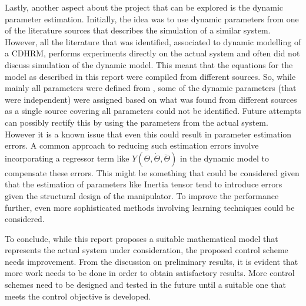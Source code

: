 \documentclass[a4paper,12pt]{report}
\begin{document}
Lastly, another aspect about the project that can be explored is the dynamic parameter estimation. Initially, the idea was to use dynamic parameters from one of the literature sources that describes the simulation of a similar system. However, all the literature that was identified, associated to dynamic modelling of a CDHRM, performs experiments directly on the actual system and often did not discuss simulation of the dynamic model. This meant that the equations for the model as described in this report were compiled from different sources. So, while mainly all parameters were defined from \cite{RN30}, some of the dynamic parameters (that were independent) were assigned based on what was found from different sources as a single source covering all parameters could not be identified. Future attempts can possibly rectify this by using the parameters from the actual system. However it is a known issue that even this could result in parameter estimation errors. A common approach to reducing such estimation errors involve incorporating a regressor term like $ Y(\Theta,\dot{\Theta},\ddot{\Theta}) $ in the dynamic model to compensate these errors. This might be something that could be considered given that the estimation of parameters like Inertia tensor tend to introduce errors given the structural design of the manipulator. To improve the performance further, even more sophisticated methods involving learning techniques could be considered.

\vspace{5mm}
To conclude, while this report proposes a suitable mathematical model that represents the actual system under consideration, the proposed control scheme needs improvement. From the discussion on preliminary results, it is evident that more work needs to be done in order to obtain satisfactory results. More control schemes need to be designed and tested in the future until a suitable one that meets the control objective is developed.


\end{document}
